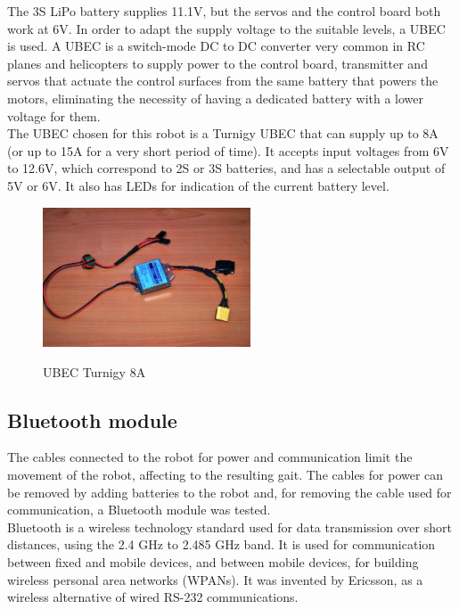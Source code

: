 The 3S LiPo battery supplies 11.1V, but the servos and the control board both work at 6V. In order to adapt the supply voltage to the suitable levels, a UBEC is used. A UBEC is a switch-mode DC to DC converter very common in RC planes and helicopters to supply power to the control board, transmitter and servos that actuate the control surfaces from the same battery that powers the motors, eliminating the necessity of having a dedicated battery with a lower voltage for them.\\

The UBEC chosen for this robot is a Turnigy UBEC that can supply up to 8A (or up to 15A for a very short period of time). It accepts input voltages from 6V to 12.6V, which correspond to 2S or 3S batteries, and has a selectable output of 5V or 6V. It also has LEDs for indication of the current battery level.\\

\begin{figure}[h]
		\centering
        \includegraphics[width=0.55\textwidth]{images/Hardware_ubec.jpg}\\
        \caption{UBEC Turnigy 8A}
        \label{fig:hardware_ubec}
\end{figure} 


\subsection{Bluetooth module}

The cables connected to the robot for power and communication limit the movement of the robot, affecting to the resulting gait. The cables for power can be removed by adding batteries to the robot and, for removing the cable used for communication, a Bluetooth module was tested.\\

Bluetooth is a wireless technology standard used for data transmission over short distances, using the 2.4 GHz to 2.485 GHz band. It is used for communication between fixed and mobile devices, and between mobile devices, for building wireless personal area networks (WPANs). It was invented by Ericsson, as a wireless alternative of wired RS-232 communications.\\

